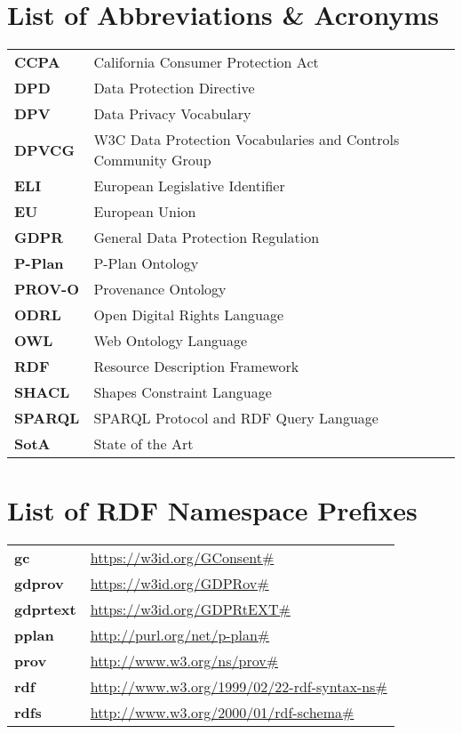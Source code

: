 \section*{List of Abbreviations \& Acronyms}
\begin{table}[htbp]
    \begin{tabular}{>{\bfseries}l|l}
        CCPA & California Consumer Protection Act \\
        DPD & Data Protection Directive \\
        DPV & Data Privacy Vocabulary \\
        DPVCG & W3C Data Protection Vocabularies and Controls Community Group \\
        ELI & European Legislative Identifier \\
        EU & European Union \\
        GDPR & General Data Protection Regulation \\
        P-Plan & P-Plan Ontology \\
        PROV-O & Provenance Ontology \\
        ODRL & Open Digital Rights Language \\ 
        OWL & Web Ontology Language \\
        RDF & Resource Description Framework \\
        SHACL & Shapes Constraint Language \\
        SPARQL & SPARQL Protocol and RDF Query Language \\
        SotA & State of the Art \\
    \end{tabular}
\end{table}

\section*{List of RDF Namespace Prefixes}
\begin{table}[htbp]
    \begin{tabular}{>{\bfseries}l|l}
        gc        & \url{https://w3id.org/GConsent#} \\
        gdprov    & \url{https://w3id.org/GDPRov#} \\
        gdprtext  & \url{https://w3id.org/GDPRtEXT#} \\
        pplan    & \url{http://purl.org/net/p-plan#} \\
        prov    & \url{http://www.w3.org/ns/prov#} \\
        rdf       & \url{http://www.w3.org/1999/02/22-rdf-syntax-ns#} \\
        rdfs      & \url{http://www.w3.org/2000/01/rdf-schema#} \\
    \end{tabular}
\end{table}
